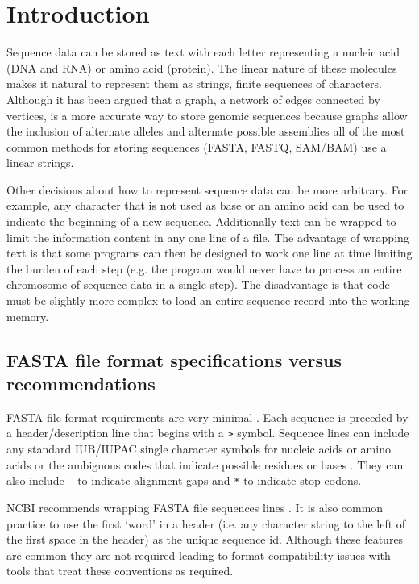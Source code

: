 
\section{Introduction}

Sequence data can be stored as text with each letter representing a nucleic acid (DNA and RNA) or amino acid (protein). The linear nature of these molecules makes it natural to represent them as strings, finite sequences of characters. Although it has been argued that a graph, a network of edges connected by vertices, is a more accurate way to store genomic sequences because graphs allow the inclusion of alternate alleles and alternate possible assemblies \cite{jaffe2012fastg} all of the most common methods for storing sequences (FASTA, FASTQ, SAM/BAM) use a linear strings.

Other decisions about how to represent sequence data can be more arbitrary. For example, any character that is not used as base or an amino acid can be used to indicate the beginning of a new sequence. Additionally text can be wrapped to limit the information content in any one line of a file. The advantage of wrapping text is that some programs can then be designed to work one line at time limiting the burden of each step (e.g. the program would never have to process an entire chromosome of sequence data in a single step). The disadvantage is that code must be slightly more complex to load an entire sequence record into the working memory.

\subsection{FASTA file format specifications versus recommendations}

FASTA file format requirements are very minimal \cite{FASTAformat}. Each sequence is preceded by a header/description line that begins with a \verb|>| symbol. Sequence lines can include any standard IUB/IUPAC single character symbols for nucleic acids or amino acids or the ambiguous codes that indicate possible residues or bases \cite{comm1970abbreviations}. They can also include \verb|-| to indicate alignment gaps and \verb|*| to indicate stop codons. 

NCBI recommends wrapping FASTA file sequences lines \cite{FASTAformat}. It is also common practice to use the first `word' in a header (i.e. any character string to the left of the first space in the header) as the unique sequence id. Although these features are common they are not required leading to format compatibility issues with tools that treat these conventions as required.

